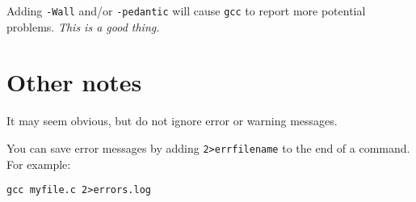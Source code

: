 Adding \texttt{-Wall} and/or \texttt{-pedantic} will cause \texttt{gcc} to report more potential problems.
\emph{This is a good thing.}

\section{Other notes}
It may seem obvious, but do not ignore error or warning messages.

You can save error messages by adding \verb|2>errfilename| to the end of a command.
For example:
\begin{verbatim}
gcc myfile.c 2>errors.log
\end{verbatim}




